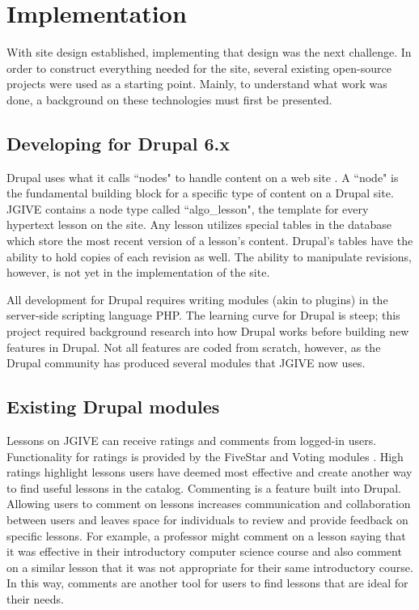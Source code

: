 \documentclass{acm_proc_article-sp}
\begin{document}
\section{Implementation}
With site design established, implementing that design was the next challenge. In order to construct everything needed for the site, several existing open-source projects were used as a starting point. Mainly, to understand what work was done, a background on these technologies must first be presented.

\subsection{Developing for Drupal 6.x}
Drupal uses what it calls ``nodes" to handle content on a web site \cite{drupal}. A ``node" is the fundamental building block for a specific type of content on a Drupal site. JGIVE contains a node type called ``algo\_lesson", the template for every hypertext lesson on the site. Any lesson utilizes special tables in the database which store the most recent version of a lesson's content. Drupal's tables have the ability to hold copies of each revision as well. The ability to manipulate revisions, however, is not yet in the implementation of the site.

All development for Drupal requires writing modules (akin to plugins) in the server-side scripting language PHP. The learning curve for Drupal is steep; this project required background research into how Drupal works before building new features in Drupal. Not all features are coded from scratch, however, as the Drupal community has produced several modules that JGIVE now uses.

\subsection{Existing Drupal modules}
\label{Existing Drupal modules}
Lessons on JGIVE can receive ratings and comments from logged-in users. Functionality for ratings is provided by the FiveStar and Voting modules \cite{drupal}. High ratings highlight lessons users have deemed most effective and create another way to find useful lessons in the catalog. Commenting is a feature built into Drupal. Allowing users to comment on lessons increases communication and collaboration between users and leaves space for individuals to review and provide feedback on specific lessons. For example, a professor might comment on a lesson saying that it was effective in their introductory computer science course and also comment on a similar lesson that it was not appropriate for their same introductory course. In this way, comments are another tool for users to find lessons that are ideal for their needs.
\end{document}
